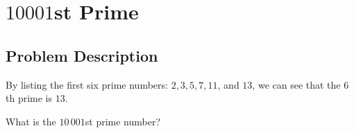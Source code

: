 \chapter{$10001$st Prime}
\section{Problem Description}
By listing the first six prime numbers: $2, 3, 5, 7, 11$, and $13$, we can see that the $6$th prime is $13$.

What is the $10\,001$st prime number?
